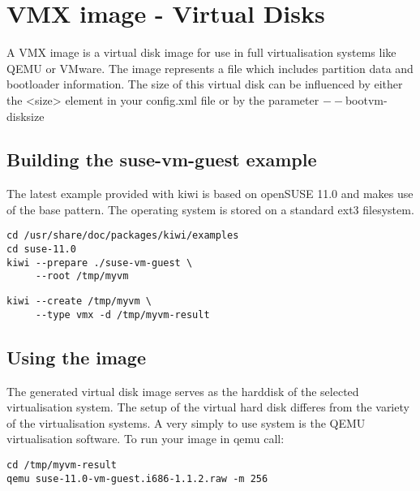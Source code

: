 \chapter{VMX image - Virtual Disks}
\label{chapter:vmx}
\minitoc

A VMX image is a virtual disk image for use in full virtualisation
systems like QEMU or VMware. The image represents a file which
includes partition data and bootloader information. The size of
this virtual disk can be influenced by either the <size> element
in your config.xml file or by the parameter $--$bootvm-disksize

\section{Building the suse-vm-guest example}

The latest example provided with kiwi is based on openSUSE 11.0 and makes use
of the base pattern. The operating system is stored on a
standard ext3 filesystem.

\begin{Command}{12cm}
\begin{verbatim}
cd /usr/share/doc/packages/kiwi/examples
cd suse-11.0
kiwi --prepare ./suse-vm-guest \
     --root /tmp/myvm
\end{verbatim}
\end{Command}

\begin{Command}{12cm}
\begin{verbatim}
kiwi --create /tmp/myvm \
     --type vmx -d /tmp/myvm-result
\end{verbatim}
\end{Command}

\section{Using the image}

The generated virtual disk image serves as the harddisk of the selected
virtualisation system. The setup of the virtual hard disk differes from
the variety of the virtualisation systems. A very simply to use system
is the QEMU virtualisation software. To run your image in qemu call:

\begin{Command}{12cm}
\begin{verbatim}
cd /tmp/myvm-result
qemu suse-11.0-vm-guest.i686-1.1.2.raw -m 256
\end{verbatim}
\end{Command}

